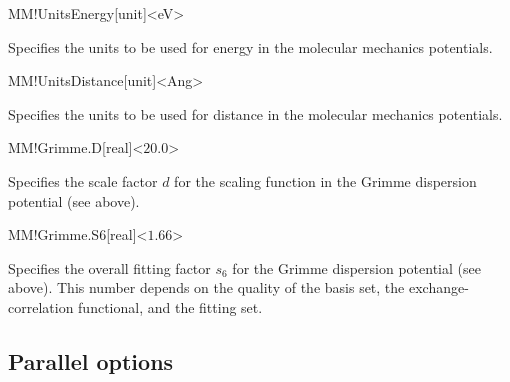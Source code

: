 \begin{fdfentry}{MM!UnitsEnergy}[unit]<eV>

  Specifies the units to be used for energy in the
  molecular mechanics potentials.
  
\end{fdfentry}

\begin{fdfentry}{MM!UnitsDistance}[unit]<Ang>
  
  Specifies the units to be used for distance in the
  molecular mechanics potentials.

\end{fdfentry}

\begin{fdfentry}{MM!Grimme.D}[real]<$20.0$>

  Specifies the scale factor $d$ for the scaling function
  in the Grimme dispersion potential (see above).

\end{fdfentry}

\begin{fdfentry}{MM!Grimme.S6}[real]<$1.66$>

  Specifies the overall fitting factor $s_6$ for the
  Grimme dispersion potential (see above). This number depends on the
  quality of the basis set, the exchange-correlation functional, and the
  fitting set.
  
\end{fdfentry}


\vspace{5pt}
\subsection{Parallel options}

